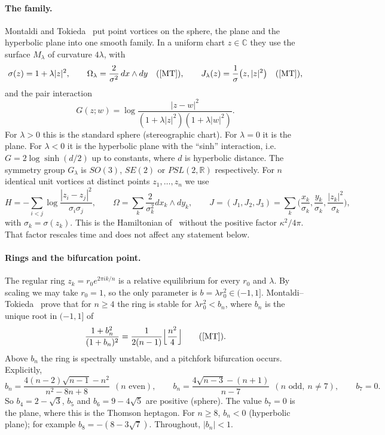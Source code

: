 \documentclass[11pt]{article}
\theoremstyle{definition}
\theoremstyle{remark}
\newcommand{\R}{\mathbb{R}}
\newcommand{\C}{\mathbb{C}}
\begin{document}
\paragraph{The family.} Montaldi and Tokieda~\cite{MT} put point vortices on the sphere, the plane and the
hyperbolic plane into one smooth family. In a uniform chart $z\in\C$ they use the surface $M_\lambda$ of
curvature $4\lambda$, with
\[
\sigma(z)=1+\lambda|z|^2,\qquad \Omega_\lambda=\frac{2}{\sigma^2}\,dx\wedge dy
\quad\text{(\cite[(1.8)]{MT})},\qquad
J_\lambda(z)=\frac1\sigma\big(z,|z|^2\big)\quad\text{(\cite[(1.9)]{MT})},
\]
and the pair interaction~\cite[(1.12)]{MT}
\[
G(z;w)=\log\frac{|z-w|^2}{(1+\lambda|z|^2)(1+\lambda|w|^2)} .
\]
For $\lambda>0$ this is the standard sphere (stereographic chart). For $\lambda=0$ it is the plane. For
$\lambda<0$ it is the hyperbolic plane with the ``sinh'' interaction, i.e.\ $G=2\log\sinh(d/2)$ up to
constants, where $d$ is hyperbolic distance. The symmetry group $G_\lambda$ is $SO(3)$, $SE(2)$ or
$PSL(2,\R)$ respectively. For $n$ identical unit vortices at distinct points $z_1,\dots,z_n$ we use
\begin{equation}\label{eq:H}
H=-\sum_{i<j}\log\frac{|z_i-z_j|^2}{\sigma_i\sigma_j},\qquad
\Omega=\sum_k\frac{2}{\sigma_k^2}dx_k\wedge dy_k,\qquad
J=(J_1,J_2,J_3)=\sum_k\Big(\frac{x_k}{\sigma_k},\frac{y_k}{\sigma_k},\frac{|z_k|^2}{\sigma_k}\Big),
\end{equation}
with $\sigma_k=\sigma(z_k)$. This is the Hamiltonian of~\cite{MT} without the positive factor $\kappa^2/4\pi$.
That factor rescales time and does not affect any statement below.

\paragraph{Rings and the bifurcation point.} The regular ring $z_k=r_0e^{2\pi ik/n}$ is a relative
equilibrium for every $r_0$ and $\lambda$. By scaling we may take $r_0=1$, so the only parameter is
$b=\lambda r_0^2\in(-1,1]$. Montaldi--Tokieda~\cite[Thm.~6]{MT} prove that for $n\ge4$ the ring is
stable for $\lambda r_0^2<b_n$, where $b_n$ is the unique root in $(-1,1]$ of
\begin{equation}\label{eq:bn}
\frac{1+b_n^2}{(1+b_n)^2}=\frac{1}{2(n-1)}\Big\lfloor\frac{n^2}{4}\Big\rfloor
\qquad\text{(\cite[(3.6)]{MT})}.
\end{equation}
Above $b_n$ the ring is spectrally unstable, and a pitchfork bifurcation occurs. Explicitly,
\[
b_n=\frac{4(n-2)\sqrt{n-1}-n^2}{n^2-8n+8}\ \ (n\text{ even}),\qquad
b_n=\frac{4\sqrt{n-3}-(n+1)}{n-7}\ \ (n\text{ odd},\ n\ne7),\qquad b_7=0 .
\]
So $b_4=2-\sqrt3$, $b_5$ and $b_6=9-4\sqrt5$ are positive (sphere). The value $b_7=0$ is the plane, where
this is the Thomson heptagon. For $n\ge8$, $b_n<0$ (hyperbolic plane); for example $b_8=-(8-3\sqrt7)$.
Throughout, $|b_n|<1$.
\end{document}
